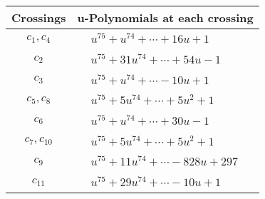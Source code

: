 \documentclass[1p]{elsarticle_modified}
\theoremstyle{definition}
\begin{document}
\begin{tabular}{m{50pt}|m{274pt}}
Crossings & \hspace{64pt}u-Polynomials at each crossing \\
\hline $$\begin{aligned}c_{1},c_{4}\end{aligned}$$&$\begin{aligned}
&u^{75}+u^{74}+\cdots+16 u+1
\end{aligned}$\\
\hline $$\begin{aligned}c_{2}\end{aligned}$$&$\begin{aligned}
&u^{75}+31 u^{74}+\cdots+54 u-1
\end{aligned}$\\
\hline $$\begin{aligned}c_{3}\end{aligned}$$&$\begin{aligned}
&u^{75}+u^{74}+\cdots-10 u+1
\end{aligned}$\\
\hline $$\begin{aligned}c_{5},c_{8}\end{aligned}$$&$\begin{aligned}
&u^{75}+5 u^{74}+\cdots+5 u^2+1
\end{aligned}$\\
\hline $$\begin{aligned}c_{6}\end{aligned}$$&$\begin{aligned}
&u^{75}+u^{74}+\cdots+30 u-1
\end{aligned}$\\
\hline $$\begin{aligned}c_{7},c_{10}\end{aligned}$$&$\begin{aligned}
&u^{75}+5 u^{74}+\cdots+5 u^2+1
\end{aligned}$\\
\hline $$\begin{aligned}c_{9}\end{aligned}$$&$\begin{aligned}
&u^{75}+11 u^{74}+\cdots-828 u+297
\end{aligned}$\\
\hline $$\begin{aligned}c_{11}\end{aligned}$$&$\begin{aligned}
&u^{75}+29 u^{74}+\cdots-10 u+1
\end{aligned}$\\
\hline
\end{tabular}\\~\\
\end{document}
